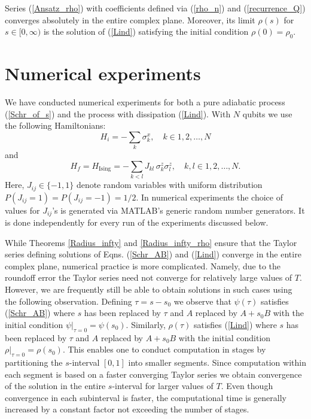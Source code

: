 \documentclass[11 pt]{article}
\begin{document}
\begin{theorem}\label{Radius_infty_rho}
Series (\ref{Ansatz_rho}) with coefficients defined via (\ref{rho_n}) and (\ref{recurrence_Q}) converges absolutely in the entire complex plane. Moreover, its limit $\rho(s)$ for $s\in [0, \infty)$ is the solution of (\ref{Lind}) satisfying the initial condition $\rho(0) = \rho_0$.
\end{theorem}

\section{Numerical experiments}\label{section_numer}

We have conducted numerical experiments for both a pure adiabatic process (\ref{Schr_of_s}) and the process with dissipation (\ref{Lind}). With $N$ qubits we use the following Hamiltonians:
\[
H_i = - \sum\limits_k \sigma_k^x, \quad k\in {1, 2, \ldots, N}
\]
and
\[
H_f = H_{\mbox{Ising}} = -\sum\limits_{k<l} J_{kl}\,\sigma_k^z\sigma_l^z, \quad k,l\in {1, 2, \ldots, N}.
\]
Here, $J_{ij}\in\{-1, 1\}$ denote random variables with uniform distribution $P(J_{ij}=1)=P(J_{ij}=-1)= 1/2$. In numerical experiments the choice of values for $J_{ij}$'s is generated via MATLAB's generic random number generators. It is done independently for every run of the experiments discussed below.

While Theorems \ref{Radius_infty} and \ref{Radius_infty_rho} ensure that the Taylor series defining solutions of Eqns. (\ref{Schr_AB}) and (\ref{Lind}) converge in the entire complex plane, numerical practice is more complicated. Namely, due to the roundoff error the Taylor series need not converge for relatively large values of $T$. However, we are frequently still be able to obtain solutions in such cases using the following observation. Defining $\tau = s-s_0$ we observe that $\psi(\tau)$ satisfies (\ref{Schr_AB}) where $s$ has been replaced by $\tau$  and $A$ replaced by $A +s_0B$ with the initial condition $\psi|_{\tau = 0} = \psi(s_0)$. Similarly, $\rho(\tau)$ satisfies (\ref{Lind}) where $s$ has been replaced by $\tau$  and $A$ replaced by $A +s_0B$ with the initial condition $\rho|_{\tau = 0} = \rho(s_0)$. This enables one to conduct computation in stages by partitioning the $s$-interval $[0,1]$ into smaller segments. Since computation within each segment is based on a faster converging Taylor series we obtain convergence of the solution in the entire $s$-interval for larger values of $T$. Even though convergence in each subinterval is faster, the computational time is generally increased by a constant factor not exceeding the number of stages.
\end{document}

